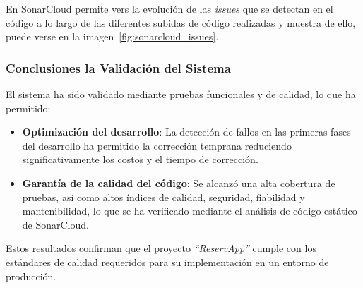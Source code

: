 
En SonarCloud permite vers la evolución de las \emph{issues} que se detectan en el código a lo largo de las diferentes subidas de código realizadas y muestra de ello, puede verse en la imagen~\ref{fig:sonarcloud_issues}.


\subsubsection{Conclusiones la Validación del Sistema}
El sistema ha sido validado mediante pruebas funcionales y de calidad, lo que ha permitido:
\begin{itemize}
   \item \textbf{Optimización del desarrollo}: La detección de fallos en las primeras fases del desarrollo ha permitido la corrección temprana reduciendo significativamente los costos y el tiempo de corrección.
   \item \textbf{Garantía de la calidad del código}: Se alcanzó una alta cobertura de pruebas, así como altos índices de calidad, seguridad, fiabilidad y mantenibilidad, lo que se ha verificado mediante el análisis de código estático de SonarCloud.
\end{itemize}

Estos resultados confirman que el proyecto \textit{``ReservApp''} cumple con los estándares de calidad requeridos para su implementación en un entorno de producción.